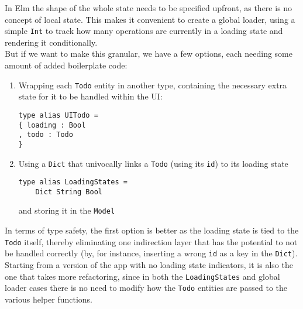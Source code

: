 In Elm the shape of the whole state needs to be specified upfront, as there is no concept of local state. This makes it convenient to create a global loader, using a simple \texttt{Int} to track how many operations are currently in a loading state and rendering it conditionally. \\
But if we want to make this granular, we have a few options, each needing some amount of added boilerplate code:
\begin{enumerate}
    \item Wrapping each \texttt{Todo} entity in another type, containing the necessary extra state for it to be handled within the UI: \\
    \begin{verbatim}
type alias UITodo =
{ loading : Bool
, todo : Todo
}
    \end{verbatim}
    \item Using a \texttt{Dict} that univocally links a \texttt{Todo} (using its \texttt{id}) to its loading state
    \begin{verbatim}
type alias LoadingStates =
    Dict String Bool
    \end{verbatim}
    and storing it in the \texttt{Model}
\end{enumerate} 

In terms of type safety, the first option is better as the loading state is tied to the \texttt{Todo} itself, thereby eliminating one indirection layer that has the potential to not be handled correctly (by, for instance, inserting a wrong \texttt{id} as a key in the \texttt{Dict}). \\
Starting from a version of the app with no loading state indicators, it is also the one that takes more refactoring, since in both the \texttt{LoadingStates} and global loader cases there is no need to modify how the \texttt{Todo} entities are passed to the various helper functions. \\

